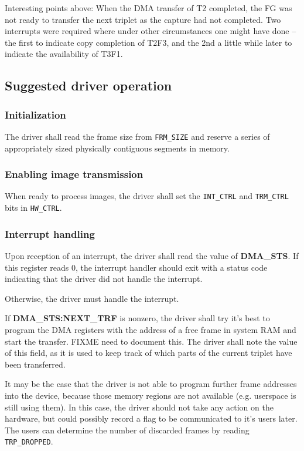 \documentclass[12pt]{article}
\begin{document}
Interesting points above: When the DMA transfer of T2 completed, the FG was not ready to transfer the next triplet as the capture had not completed. Two interrupts were required where under other circumstances one might have done -- the first to indicate copy completion of T2F3, and the 2nd a little while later to indicate the availability of T3F1.

\subsection{Suggested driver operation}

\subsubsection{Initialization}

The driver shall read the frame size from \texttt{FRM\_SIZE} and reserve a series of appropriately sized physically contiguous segments in memory.

\subsubsection{Enabling image transmission}

When ready to process images, the driver shall set the \texttt{INT\_CTRL} and \texttt{TRM\_CTRL} bits in \texttt{HW\_CTRL}.

\subsubsection{Interrupt handling}

Upon reception of an interrupt, the driver shall read the value of \textbf{DMA\_STS}. If this register reads 0, the interrupt handler should exit with a status code indicating that the driver did not handle the interrupt.

Otherwise, the driver must handle the interrupt.

If \textbf{DMA\_STS:NEXT\_TRF} is nonzero, the driver shall try it's best to program the DMA registers with the address of a free frame in system RAM and start the transfer. FIXME need to document this. The driver shall note the value of this field, as it is used to keep track of which parts of the current triplet have been transferred.

It may be the case that the driver is not able to program further frame addresses into the device, because those memory regions are not available (e.g. userspace is still using them). In this case, the driver should not take any action on the hardware, but could possibly record a flag to be communicated to it's users later. The users can determine the number of discarded frames by reading \texttt{TRP\_DROPPED}.
\end{document}
